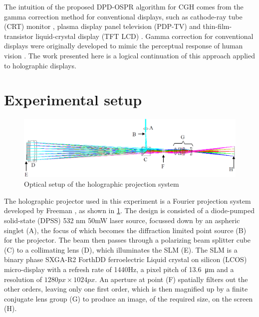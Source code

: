 The intuition of the proposed DPD-OSPR algorithm for CGH comes from the gamma correction method for conventional displays, such as cathode-ray tube (CRT) monitor \cite{Xu2009}, plasma display panel television (PDP-TV) \cite{Sung2009} and thin-film-transistor liquid-crystal display (TFT LCD) \cite{Lee2005,Prraga2014}. Gamma correction for conventional displays were originally developed to mimic the perceptual response of human vision \cite{Poynton2012}. The work presented here is a logical continuation of this approach applied to holographic displays.




\section{Experimental setup} \label{sec:experimental setup}

\begin{figure}[H]
    \centering
    \includegraphics[width=\textwidth]{projection_setup.png}
    \caption{Optical setup of the holographic projection system \cite{Freeman2009}}
    \label{fig:projection_setup}
\end{figure}

The holographic projector used in this experiment is a Fourier projection system developed by Freeman \cite{Freeman2009}, as shown in \cref{fig:projection_setup}. The design is consisted of a diode-pumped solid-state (DPSS) 532 nm 50mW laser source, focussed down by an aspheric singlet (A), the focus of which becomes the diffraction limited point source (B) for the projector. The beam then passes through a polarizing beam splitter cube (C) to a collimating lens (D), which illuminates the SLM (E). The SLM is a binary phase SXGA-R2 ForthDD ferroelectric Liquid crystal on silicon (LCOS) micro-display with a refresh rate of 1440Hz, a pixel pitch of \SI{13.6}{\micro\metre} and a resolution of $1280px \times 1024px$. An aperture at point (F) spatially filters out the other orders, leaving only one first order, which is then magnified up by a finite conjugate lens group (G) to produce an image, of the required size, on the screen (H). \cite{Freeman2009}

